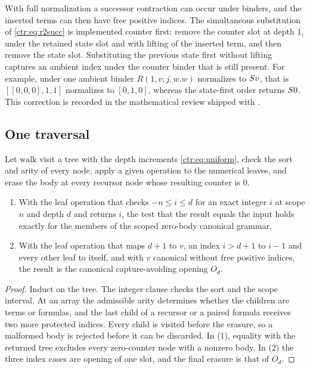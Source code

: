\begin{remark}\label{ctr:rem:counterfirst}
With full normalization a successor contraction can occur under binders, and the inserted
terms can then have free positive indices. The simultaneous substitution of
\eqref{ctr:eq:r2succ} is implemented counter first: remove the counter slot at depth $1$,
under the retained state slot and with lifting of the inserted term, and then remove the
state slot. Substituting the previous state first without lifting captures an ambient index
under the counter binder that is still present. For example, under one ambient binder
$R(1,v;j,w.w)$ normalizes to $S v$, that is $[[0,0,0],1,1]$ normalizes to $[0,1,0]$,
whereas the state-first order returns $S 0$. This correction is recorded in the
mathematical review shipped with .
\end{remark}

\subsection{One traversal}

\begin{lemma}\label{ctr:lem:walker}
Let $\mathrm{walk}$ visit a tree with the depth increments \eqref{ctr:eq:uniform}, check
the sort and arity of every node, apply a given operation to the numerical leaves, and
erase the body at every recursor node whose resulting counter is $0$.
\begin{enumerate}
\item With the leaf operation that checks $-n\le i\le d$ for an exact integer $i$ at scope
$n$ and depth $d$ and returns $i$, the test that the result equals the input holds exactly
for the members of the scoped zero-body canonical grammar.
\item With the leaf operation that maps $d+1$ to $v$, an index $i>d+1$ to $i-1$ and every
other leaf to itself, and with $v$ canonical without free positive indices, the result is
the canonical capture-avoiding opening $O_d$.
\end{enumerate}
\end{lemma}
\begin{proof}
Induct on the tree. The integer clause checks the sort and the scope interval. At an array
the admissible arity determines whether the children are terms or formulas, and the last
child of a recursor or a paired formula receives two more protected indices. Every child is
visited before the erasure, so a malformed body is rejected before it can be discarded. In
(1), equality with the returned tree excludes every zero-counter node with a nonzero body.
In (2) the three index cases are opening of one slot, and the final erasure is that of
$O_d$.
\end{proof}


